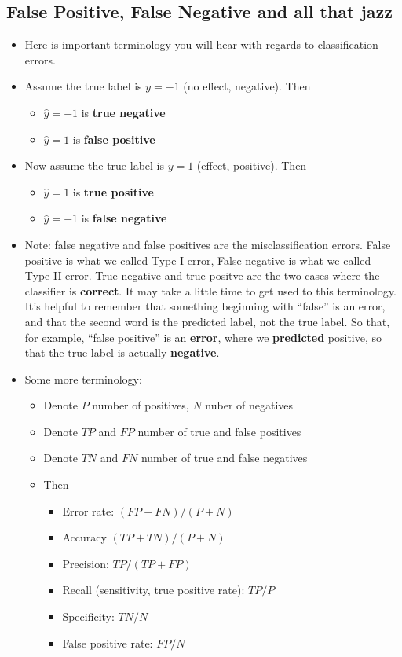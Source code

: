 \documentclass[11pt]{article}
\begin{document}
    \subsection{False Positive, False Negative and all that jazz}

    \begin{itemize}

  \item Here is important terminology you will hear with regards to
	classification errors.
    \item Assume the true label is $y=-1$ (no effect, negative).
      Then 
      \begin{itemize}
        \item  $\hat{y}=-1$ is {\bf true negative}
        \item  $\hat{y}=1$ is {\bf false positive}
      \end{itemize}
    \item Now assume the true label is $y=1$ (effect, positive).
      Then
      \begin{itemize}
        \item $\hat{y}=1$ is {\bf true positive}
        \item $\hat{y}=-1$ is {\bf false negative}
      \end{itemize}
    \item Note: false negative and false positives are the misclassification
      errors. False positive is what we called Type-I error, False negative is
      what we called Type-II error. True negative and true positve are the two
      cases where the classifier is {\bf correct}. It may take a little time to
      get used to this terminology. It's helpful to remember that something
      beginning with ``false'' is an error, and that the second word is the
      predicted label, not the true label. So that, for example, ``false
      positive'' is an {\bf error}, where we {\bf predicted} positive, so that the true
      label is actually {\bf negative}.

    \item Some more terminology:
    \begin{itemize}
     \item Denote $P$ number of positives, $N$ nuber of negatives
     \item Denote $TP$ and $FP$ number of true and false positives
\item Denote $TN$ and $FN$ number of true and false negatives
\item Then
  \begin{itemize}
    \item Error rate: $(FP+FN)/(P+N)$
    \item Accuracy $(TP+TN)/(P+N)$
    \item Precision: $TP/(TP+FP)$
    \item Recall (sensitivity, true positive rate): $TP/P$
    \item Specificity: $TN/N$
    \item False positive rate: $FP/N$
  \end{itemize}

   \end{itemize}
    \end{itemize}
 
\end{document}
